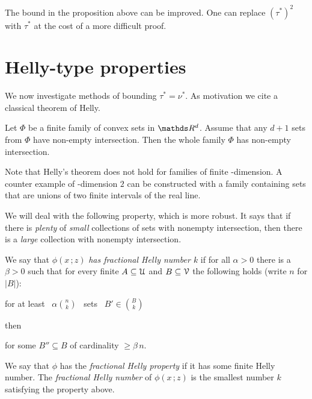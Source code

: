 \documentclass[scombinatorics.tex]{subfiles}
\begin{document}
The bound in the proposition above can be improved.
One can replace $(\tau^*)^2$ with  $\tau^*$ at the cost of a more difficult proof.

\section{Helly-type properties}

We now investigate methods of bounding $\tau^*=\nu^*$.
As motivation we cite a classical theorem of Helly.

\begin{proposition}
Let $\Phi$ be a finite family of convex sets in $\RR^d$.
Assume that any $d+1$ sets from $\Phi$ have non-empty intersection.
Then the whole family $\Phi$ has non-empty intersection.\QED
\end{proposition}

Note that Helly's theorem does not hold for families of finite \vc-dimension.
A counter example of \vc-dimension $2$ can be constructed with a family containing sets that are unions of two finite intervals of the real line.

We will deal with the following property, which is more robust. It says that if there is \textit{plenty\/} of \textit{small\/} collections of sets with nonempty intersection, then there is a \textit{large\/} collection with nonempty intersection.

\begin{definition}
We say that $\phi(x\,;z)$ \emph{has fractional Helly number $k$\/} if for all $\alpha>0$ there is a $\beta>0$ such that  for every finite $A\subseteq\EuScript U$ and $B\subseteq\EuScript V$ the following holds (write $n$ for $|B|$):

\hfill for at least \ $\displaystyle\alpha{n\choose k}$ \ sets \ $\displaystyle B'\in{B\choose k}$

then

\hfill for some $B''\subseteq B$ of cardinality $\ge\beta\,n$.


We say that $\phi$ has the \emph{fractional Helly property\/} if it has some finite Helly number.
The \emph{fractional Helly number\/} of $\phi(x\,;z)$ is the smallest number $k$ satisfying the property above.\QED
\end{definition}
\end{document}
